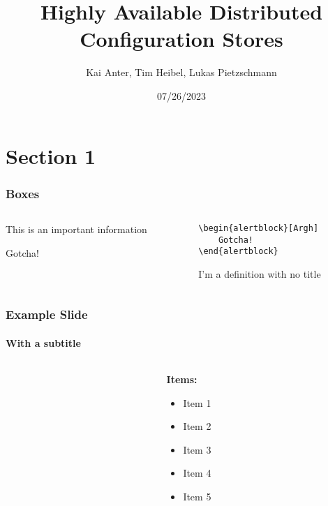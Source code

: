 \documentclass[aspectratio=169, usepdftitle=false]{beamer}
\title[Distributed Config Stores]{Highly Available Distributed Configuration Stores}
\author[Kai, Tim, Lukas]{Kai Anter, Tim Heibel, Lukas Pietzschmann}
\subtitle{}
\institute{Institute of Distributed Systems}
\date{07/26/2023}
\begin{document}
\maketitle

\section{Section 1}
\begin{frame}[fragile]
	\frametitle{Boxes}
	\begin{columns}[t]
		\begin{column}{0.45\textwidth}
			\begin{block}
				This is an important information
			\end{block}
			\begin{alertblock}[Argh]
				Gotcha!
			\end{alertblock}
		\end{column}
		\begin{column}{0.45\textwidth}
			\begin{examples}[Example 1]
				\begin{verbatim}
\begin{alertblock}[Argh]
	Gotcha!
\end{alertblock}
				\end{verbatim}
			\end{examples}
			\begin{definition}
				I'm a definition with no title
			\end{definition}
		\end{column}
	\end{columns}
\end{frame}
\begin{frame}
	\frametitle[Another Title]{Example Slide}
	\framesubtitle{With a subtitle}
	\begin{columns}[t]
		\begin{column}{0.45\textwidth}
			\lipsum[1][1-5]
		\end{column}
		\begin{column}{0.45\textwidth}
			\textbf{Items:}
			\begin{itemize}
				\item Item 1
				\item Item 2
				\item Item 3
				\item Item 4
				\item Item 5
			\end{itemize}
		\end{column}
	\end{columns}
\end{frame}
\end{document}
